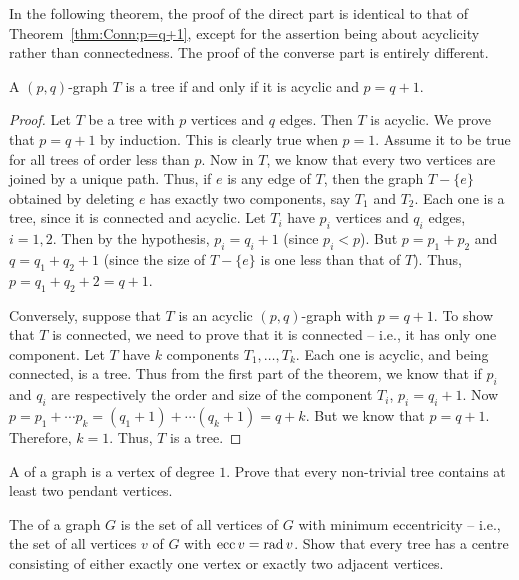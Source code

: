 In the following theorem, the proof of the direct part is identical to that of Theorem~\ref{thm:Conn;p=q+1}, except for the assertion being about acyclicity rather than connectedness. The proof of the converse part is entirely different.
\begin{Theorem}\label{thm:Acyc;p=q+1}
A $(p,q)$-graph $T$ is a tree if and only if it is acyclic and $p = q + 1$.
\end{Theorem}
\begin{proof}
Let $T$ be a tree with $p$ vertices and $q$ edges. Then $T$ is acyclic. We prove that $p = q + 1$ by induction. This is clearly true when $p = 1$. Assume it to be true for all trees of order less than $p$. Now in $T$, we know that every two vertices are joined by a unique path. Thus, if $e$ is any edge of $T$, then the graph $T - \{e\}$ obtained by deleting $e$ has exactly two components, say $T_1$ and $T_2$. Each one is a tree, since it is connected and acyclic. Let $T_i$ have $p_i$ vertices and $q_i$ edges, $i = 1, 2$. Then by the hypothesis, $p_i = q_i + 1$ (since $p_i < p$). But $p = p_1 + p_2$ and $q = q_1 + q_2 + 1$ (since the size of $T - \{e\}$ is one less than that of $T$). Thus, $p = q_1 + q_2 + 2 = q + 1$.

Conversely, suppose that $T$ is an acyclic $(p,q)$-graph with $p = q + 1$. To show that $T$ is connected, we need to prove that it is connected -- i.e., it has only one component. Let $T$ have $k$ components $T_1, \ldots, T_k$. Each one is acyclic, and being connected, is a tree. Thus from the first part of the theorem, we know that if $p_i$ and $q_i$ are respectively the order and size of the component $T_i$, $p_i = q_i + 1$. Now $p = p_1 + \cdots p_k = (q_1 + 1) + \cdots (q_k + 1) = q + k$. But we know that $p = q + 1$. Therefore, $k = 1$. Thus, $T$ is a tree.
\end{proof}

\begin{Exercise}
A  of a graph is a vertex of degree $1$. Prove that every non-trivial tree contains at least two pendant vertices.\\
\end{Exercise}

\begin{Exercise}
The  of a graph $G$ is the set of all vertices of $G$ with minimum eccentricity -- i.e., the set of all vertices $v$ of $G$ with $\operatorname{ecc} v = \operatorname{rad} v$. Show that every tree has a centre consisting of either exactly one vertex or exactly two adjacent vertices.\\
\end{Exercise}

